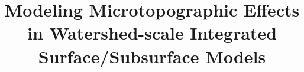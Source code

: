 \documentclass[review,11pt]{elsarticle}
\begin{document}
\begin{frontmatter}

\title{Modeling Microtopographic Effects in Watershed-scale Integrated Surface/Subsurface Models}






\end{frontmatter}
\end{document}
